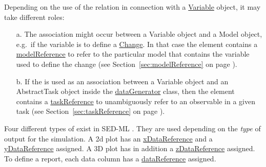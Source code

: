 Depending on the use of the  relation in connection with a \hyperref[class:variable]{Variable} object, it may take different roles: 
\begin{enumerate}
\item[a.]{The  association might occur between a Variable object and a Model object, e.g.\ if the variable is to define a \hyperref[class:change]{Change}. 
In that case the  element contains a \hyperref[sec:modelReference]{modelReference} to refer to the particular model that contains the variable used to define the change (see Section~\ref{sec:modelReference} on page \pageref{sec:modelReference}). }
\item[b.]{If the  is used as an association between a Variable object and an AbstractTask object inside the \hyperref[class:dataGenerator]{dataGenerator} class, then the  element contains a \hyperref[sec:taskReference]{taskReference} to unambiguously refer to an observable in a given task (see Section~\ref{sec:taskReference} on page \pageref{sec:taskReference}).}
\end{enumerate}

Four different types of  exist in SED-ML \LoneVtwo. They are used depending on the \emph{type} of output for the simulation. A 2d plot has an \hyperref[sec:xDataReference]{xDataReference} and a \hyperref[sec:yDataReference]{yDataReference} assigned. A 3D plot has in addition a \hyperref[sec:zDataReference]{zDataReference} assigned. To define a report, each data column has a \hyperref[sec:dataReference1]{dataReference} assigned.










